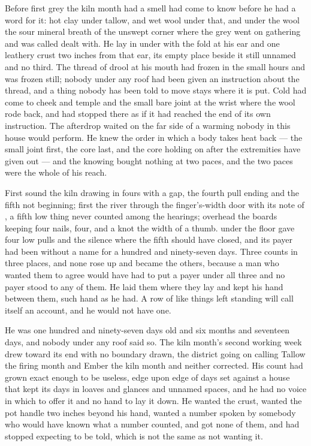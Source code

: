 
Before first grey the kiln month had a smell  had come to know before he had a word for it: hot clay under tallow, and wet wool under that, and under the wool the sour mineral breath of the unswept corner where the grey went on gathering and was called dealt with. He lay in  under  with the fold at his ear and one leathery crust two inches from that ear, its empty place beside it still unnamed and no third. The thread of drool at his mouth had frozen in the small hours and was frozen still; nobody under any roof had been given an instruction about the thread, and a thing nobody has been told to move stays where it is put. Cold had come to cheek and temple and the small bare joint at the wrist where the wool rode back, and had stopped there as if it had reached the end of its own instruction. The afterdrop waited on the far side of a warming nobody in this house would perform. He knew the order in which a body takes heat back --- the small joint first, the core last, and the core holding on after the extremities have given out --- and the knowing bought nothing at two paces, and the two paces were the whole of his reach.

First sound the kiln drawing in fours with a gap, the fourth pull ending and the fifth not beginning; first the river through the finger's-width door with its note of , a fifth low thing never counted among the hearings; overhead the boards keeping four nails, four, and a knot the width of a thumb.  under the floor gave four low pulls and the silence where the fifth should have closed, and its payer had been without a name for a hundred and ninety-seven days. Three counts in three places, and none rose up and became the others, because a man who wanted them to agree would have had to put a payer under all three and no payer stood to any of them. He laid them where they lay and kept his hand between them, such hand as he had. A row of like things left standing will call itself an account, and he would not have one.

He was one hundred and ninety-seven days old and six months and seventeen days, and nobody under any roof said so. The kiln month's second working week drew toward its end with no boundary drawn, the district going on calling Tallow the firing month and Ember the kiln month and neither corrected. His count had grown exact enough to be useless, edge upon edge of days set against a house that kept its days in loaves and glances and unnamed spaces, and he had no voice in which to offer it and no hand to lay it down. He wanted the crust, wanted the pot handle two inches beyond his hand, wanted a number spoken by somebody who would have known what a number counted, and got none of them, and had stopped expecting to be told, which is not the same as not wanting it.

